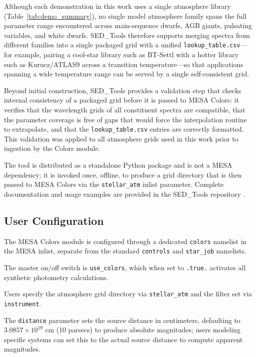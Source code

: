 \documentclass[linenumbers,apj,twocolumn, floatfix]{aastex701} \usepackage{amsmath} \usepackage{longtable} \usepackage{graphicx} \usepackage{ulem} \usepackage{xcolor} \usepackage{lettrine} \usepackage{yfonts} \usepackage{rotating}
\begin{document}
Although each demonstration in this work uses a single atmosphere library (Table~\ref{tab:demo_summary}), no single model atmosphere family spans the full parameter range encountered across main-sequence dwarfs, AGB giants, pulsating variables, and white dwarfs.
SED\_Tools therefore supports merging spectra from different families into a single packaged grid with a unified \texttt{lookup\_table.csv}---for example, pairing a cool-star library such as BT-Settl with a hotter library such as Kurucz/ATLAS9 across a transition temperature---so that applications spanning a wide temperature range can be served by a single self-consistent grid.

Beyond initial construction, SED\_Tools provides a validation step that checks internal consistency of a packaged grid before it is passed to MESA Colors: it verifies that the wavelength grids of all constituent spectra are compatible, that the parameter coverage is free of gaps that would force the interpolation routine to extrapolate, and that the \texttt{lookup\_table.csv} entries are correctly formatted.
This validation was applied to all atmosphere grids used in this work prior to ingestion by the Colors module.

The tool is distributed as a standalone Python package and is not a MESA dependency; it is invoked once, offline, to produce a grid directory that is then passed to MESA Colors via the \texttt{stellar\_atm} inlist parameter.
Complete documentation and usage examples are provided in the SED\_Tools repository \citep{SED_Tools}.

\subsection{User Configuration}
\label{sec:user_workflow}

The MESA Colors module is configured through a dedicated \texttt{colors} namelist in the MESA inlist, separate from the standard \texttt{controls} and \texttt{star\_job} namelists.

The master on/off switch is \texttt{use\_colors}, which when set to \texttt{.true.} activates all synthetic photometry calculations.

Users specify the atmosphere grid directory via \texttt{stellar\_atm} and the filter set via \texttt{instrument}.

The \texttt{distance} parameter sets the source distance in centimeters, defaulting to $3.0857 \times 10^{19}$ cm (10 parsecs) to produce absolute magnitudes; users modeling specific systems can set this to the actual source distance to compute apparent magnitudes.
\end{document}
